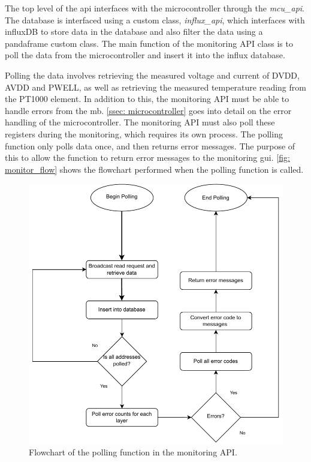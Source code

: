 \documentclass[main.tex]{subfiles}
\begin{document}
The top level of the \gls{api} interfaces with the microcontroller through the \textit{mcu\_api}. The database is interfaced using a custom class, \textit{influx\_api}, which interfaces with influxDB to store data in the database and also filter the data using a pandaframe custom class. The main function of the monitoring API class is to poll the data from the microcontroller and insert it into the influx database. 

Polling the data involves retrieving the measured voltage and current of DVDD, AVDD and PWELL, as well as retrieving the measured temperature reading from the PT1000 element. In addition to this, the monitoring API must be able to handle errors from the \gls{mb}. \autoref{ssec: microcontroller} goes into detail on the error handling of the microcontroller. The monitoring API must also poll these registers during the monitoring, which requires its own process. The polling function only polls data once, and then returns error messages. The purpose of this to allow the function to return error messages to the monitoring \gls{gui}. \autoref{fig: monitor_flow} shows the flowchart performed when the polling function is called.

\begin{figure}[!ht]
    \centering
    \includegraphics[scale=0.9]{images/Monitoring Flowchart.pdf}
    \caption{Flowchart of the polling function in the monitoring API.}
    \label{fig: monitor_flow}
\end{figure}
\FloatBarrier
\end{document}
